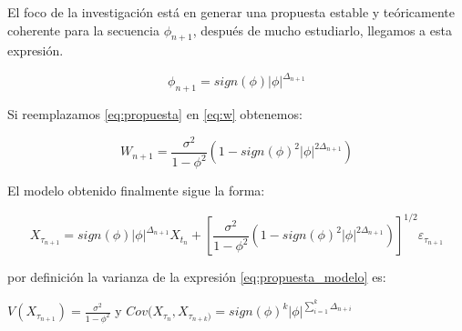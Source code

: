 El foco de la investigación está en generar una propuesta estable y teóricamente coherente para la secuencia $\phi_{n+1}$, después de mucho estudiarlo, llegamos a esta expresión.

\begin{equation}
\phi_{n+1} = sign(\phi)|\phi|^{\Delta_{n+1}}
\end{equation}\label{eq:propuesta}

Si reemplazamos \ref{eq:propuesta} en \ref{eq:w} obtenemos:

\begin{equation}
W_{n+1} = \frac{\sigma^2}{1-\phi^2} \left(1-sign(\phi)^2 |\phi|^{2\Delta_{n+1}}\right)
\end{equation}\label{eq:w}

El modelo obtenido finalmente sigue la forma:

\begin{equation}
X_{\tau_{n+1}} = sign(\phi)|\phi|^{\Delta_{n+1}} X_{t_n} + \left[\frac{\sigma^2}{1-\phi^2} \left(1-sign(\phi)^2 |\phi|^{2\Delta_{n+1}}\right)\right]^{1/2} \varepsilon_{\tau_{n+1}}
\end{equation}\label{eq:propuesta_modelo}
 
por definición la varianza de la expresión \ref{eq:propuesta_modelo} es:

 $V(X_{\tau_{n+1}}) =  \frac{\sigma^2}{1-\phi^2}$ y $Cov(X_{\tau_n}, X_{\tau_{n+k})} = sign(\phi)^k|\phi|^{\sum_{i=1}^{k}\Delta_{n+i}}$






